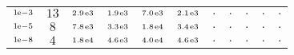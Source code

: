 \begin{tiny}
\begin{tabular}{@{$\;$}c@{$\;$}|@{$\;$}c@{$\;$}@{$\;$}c@{$\;$}@{$\;$}c@{$\;$}@{$\;$}c@{$\;$}@{$\;$}c@{$\;$}|@{$\;$}c@{$\;$}@{$\;$}c@{$\;$}@{$\;$}c@{$\;$}@{$\;$}c@{$\;$}@{$\;$}c@{$\;$}}
$\scriptstyle1\!\mathrm{\hspace{0.10em}e}-3$ & $\scriptstyle13$ & $\scriptstyle2.9\mathrm{\hspace{0.10em}e}3$ & $\scriptstyle1.9\mathrm{\hspace{0.10em}e}3$ & $\scriptstyle7.0\mathrm{\hspace{0.10em}e}3$ & $\scriptstyle2.1\mathrm{\hspace{0.10em}e}3$ & $\scriptstyle.$ & $\scriptstyle.$ & $\scriptstyle.$ & $\scriptstyle.$ & $\scriptstyle.$\\ 
$\scriptstyle1\!\mathrm{\hspace{0.10em}e}-5$ & $\scriptstyle8$ & $\scriptstyle7.8\mathrm{\hspace{0.10em}e}3$ & $\scriptstyle3.3\mathrm{\hspace{0.10em}e}3$ & $\scriptstyle1.8\mathrm{\hspace{0.10em}e}4$ & $\scriptstyle3.4\mathrm{\hspace{0.10em}e}3$ & $\scriptstyle.$ & $\scriptstyle.$ & $\scriptstyle.$ & $\scriptstyle.$ & $\scriptstyle.$\\ 
$\scriptstyle1\!\mathrm{\hspace{0.10em}e}-8$ & $\scriptstyle4$ & $\scriptstyle1.8\mathrm{\hspace{0.10em}e}4$ & $\scriptstyle4.6\mathrm{\hspace{0.10em}e}3$ & $\scriptstyle4.0\mathrm{\hspace{0.10em}e}4$ & $\scriptstyle4.6\mathrm{\hspace{0.10em}e}3$ & $\scriptstyle.$ & $\scriptstyle.$ & $\scriptstyle.$ & $\scriptstyle.$ & $\scriptstyle.$\\ 
\end{tabular} 
\end{tiny} 

